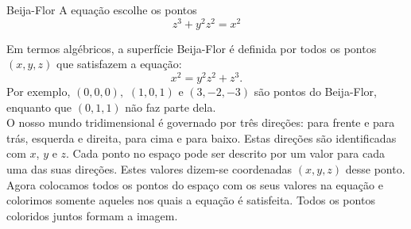 \begin{surferPage}{Beija-Flor}
A equa\c c\~ao escolhe os pontos\\
  
  \smallskip
\[z^3+ y^2	z^2	= x^2\]

\singlespacing
Em termos alg\'ebricos, a superf\'icie Beija-Flor \'e definida por todos os pontos $(x, y, z)$ que satisfazem a equa\c c\~ao:
\smallskip
\[ x^2= y^2z^2+z^3.\]
\smallskip
Por exemplo, $(0,0,0),$ $(1,0,1)$ e $(3,-2,-3)$ s\~ao pontos do Beija-Flor, enquanto que $(0,1,1)$ n\~ao faz parte dela.\\
 \singlespacing
 O nosso mundo tridimensional \'e governado por tr\^es dire\c c\~oes: para frente e para tr\'as, esquerda e direita, para cima e para baixo. Estas dire\c c\~oes s\~ao identificadas com $x$, $y$ e $z$. Cada ponto no espa\c co pode ser descrito por um valor para cada uma das suas dire\c c\~oes. Estes valores dizem-se coordenadas $(x,y,z)$ desse ponto.\\
\singlespacing
Agora colocamos todos os pontos do espa\c co com os seus valores na equa\c c\~ao e colorimos somente aqueles nos quais a equa\c c\~ao \'e satisfeita. Todos os pontos coloridos juntos formam a imagem.
\end{surferPage}
